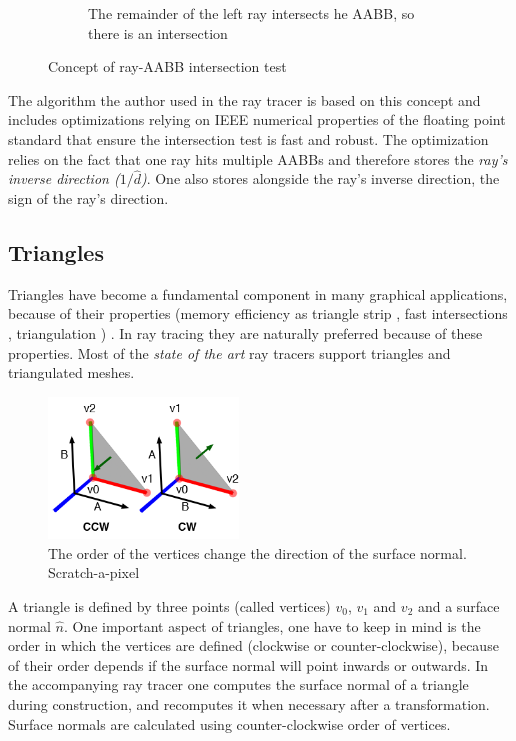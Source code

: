 \documentclass{article}
\begin{document}
\begin{figure}[h]
\begin{subfigure}[t]{0.21\linewidth}
		\caption{The remainder of  the left ray intersects he AABB, so there is an intersection}
		\label{fig:aabb4}
	\end{subfigure}
	\caption{Concept of ray-AABB intersection test}
	\label{fig:aabb_concept}
\end{figure}

The algorithm the author used in the ray tracer is based on this concept and includes optimizations relying on IEEE numerical properties of the floating point standard that ensure the intersection test is fast and robust. The optimization relies on the fact that one ray hits multiple AABBs and therefore stores the \textit{ray's inverse direction ($1 / \hat{d}$)}. One also stores alongside the ray's inverse direction, the sign of the ray's direction. \cite{efficient_raybox}
\subsection{Triangles}

Triangles have become a fundamental component in many graphical applications, because of their properties (memory efficiency as triangle strip \cite{triangle_strip}, fast intersections \cite{fast_triangle_isect}, triangulation \cite{triangulation}) . In ray tracing they are naturally preferred because of these properties. Most of the \textit{state of the art} ray tracers support triangles and triangulated meshes. 

\vspace*{\baselineskip}

\begin{figure} 
    \centering
    \includegraphics[width=0.45\textwidth]{triangle_vertices_n}
    \caption{The order of the vertices change the direction of the surface normal. Scratch-a-pixel}
    \label{fig:tri_vertex_order}
\end{figure}

A triangle is defined by three points (called vertices) $v_0$, $v_1$ and $v_2$ and a surface normal $\hat{n}$. One important aspect of triangles, one have to keep in mind is the order in which the vertices are defined (clockwise or counter-clockwise), because of their order depends if the surface normal will point inwards or outwards. In the accompanying ray tracer one computes the surface normal of a triangle during construction, and recomputes it when necessary after a transformation. Surface normals are calculated using counter-clockwise order of vertices.
\end{document}

